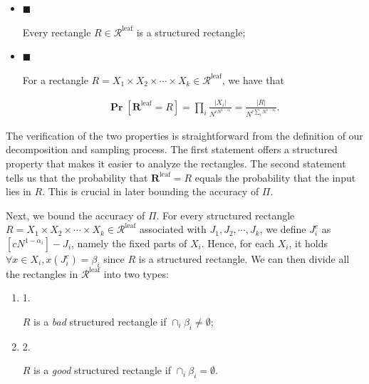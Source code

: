 \begin{itemize}


\item[] 
$\blacksquare$ 


Every rectangle $R\in\mathcal{R}^{\text{leaf}}$ is a structured rectangle;\par





\item[] 
$\blacksquare$ 


For a rectangle $R=X_{1}\times X_{2}\times\cdots\times X_{k}\in\mathcal{R}^{\text{leaf}}$, we have that\par


\[\begin{gathered}
\operatorname*{\mathbf{Pr}}[\bm{R}^{\text{leaf}}=R]=\prod_{i}\frac{|X_{i}|}{N^{cN^{1-\alpha_{i}}}}=\frac{|R|}{N^{c\sum_{i}N^{1-\alpha_{i}}}}.
\end{gathered}\]





\end{itemize}


The verification of the two properties is straightforward from the definition of our decomposition and sampling process. The first statement offers a structured property that makes it easier to analyze the rectangles. The second statement tells us that the probability that $\bm{R}^{\text{leaf}}=R$ equals the probability that the input lies in $R$. This is crucial in later bounding the accuracy of $\Pi$.\par




Next, we bound the accuracy of $\Pi$. For every structured rectangle $R=X_{1}\times X_{2}\times\cdots\times X_{k}\in\mathcal{R}^{\text{leaf}}$ associated with $J_{1},J_{2},\cdots,J_{k}$, we define $J_{i}^{c}$ as $[cN^{1-\alpha_{i}}]-J_{i}$, namely the fixed parts of $X_{i}$. Hence, for each $X_{i}$, it holds $\forall x\in X_{i},x(J_{i}^{c})=\beta_{i}$ since $R$ is a structured rectangle. We can then divide all the rectangles in $\mathcal{R}^{\text{leaf}}$ into two types:\par


\begin{enumerate}


\item[] 
1. 


$R$ is a \emph{bad} structured rectangle if $\cap_{i}\beta_{i}\neq\emptyset$;\par





\item[] 
2. 


$R$ is a \emph{good} structured rectangle if $\cap_{i}\beta_{i}=\emptyset$.\par





\end{enumerate}


